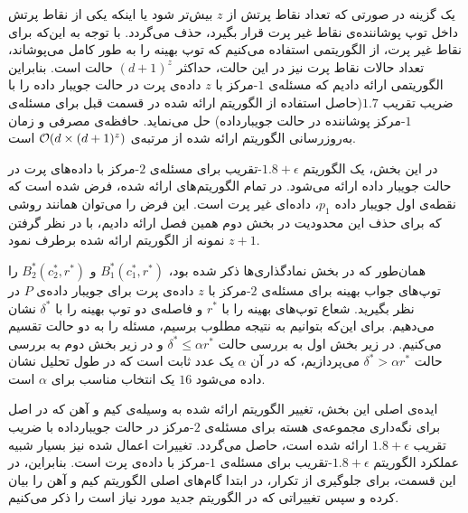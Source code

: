 یک گزینه در صورتی که تعداد نقاط‌ پرتش از $z$ بیش‌تر شود یا اینکه یکی از نقاط پرتش داخل توپ پوشاننده‌ی نقاط غیر پرت قرار بگیرد، حذف می‌گردد. با توجه به این‌که برای نقاط غیر پرت، از‌ الگوریتمی استفاده می‌کنیم که توپ بهینه را به طور کامل می‌پوشاند، تعداد حالات نقاط پرت نیز در این حالت، حداکثر $(d+1)^z$ حالت است. بنابراین الگوریتمی ارائه دادیم که مسئله‌ی $1$-مرکز با $z$ داده‌ی پرت در حالت جویبار داده را با ضریب تقریب $1.7$(حاصل استفاده از الگوریتم ارائه شده در قسمت قبل برای مسئله‌ی $1$-مرکز پوشاننده در حالت جویبارداده) حل می‌نماید. حافظه‌ی مصرفی و زمان به‌روزرسانی الگوریتم ارائه شده از مرتبه‌ی $\mathcal{O}(d \times (d+1)^z)$ است.


در این بخش، یک الگوریتم $1.8 + \epsilon$-تقریب برای مسئله‌ی $2$-مرکز با داده‌های پرت در حالت جویبار داده ارائه می‌شود.
در تمام الگوریتم‌های ارائه شده، فرض شده است که نقطه‌ی اول جویبار داده $p_1$، داده‌ای غیر پرت است.
این فرض را می‌توان همانند روشی که برای حذف این محدودیت در بخش دوم همین فصل ارائه دادیم، با در نظر گرفتن $z+1$ نمونه از الگوریتم ارائه شده برطرف نمود.

همان‌طور که در بخش نمادگذاری‌ها ذکر شده بود، $B_1^*(c_1^*, r^*)$ و $B_2^*(c_2^*, r^*)$ را توپ‌های جواب بهینه برای مسئله‌ی $2$-مرکز با $z$ داده‌ی پرت برای جویبار داده‌ی $P$ در نظر بگیرید.
شعاع توپ‌های بهینه را با $r^*$ و فاصله‌ی دو توپ بهینه را با $\delta^*$ نشان می‌دهیم.
برای این‌که بتوانیم به نتیجه مطلوب برسیم، مسئله را به دو حالت تقسیم می‌کنیم.
در زیر بخش اول به بررسی حالت $\delta^* \leq \alpha r^*$ و در زیر بخش دوم به بررسی حالت $\delta^* > \alpha r^*$ می‌پردازیم، که در آن $\alpha$ یک عدد ثابت است که در طول تحلیل نشان داده می‌شود $16$ یک انتخاب مناسب برای $\alpha$ است.



ایده‌ی اصلی این بخش، تغییر الگوریتم ارائه شده به وسیله‌ی کیم و آهن  که در اصل برای نگه‌داری مجموعه‌ی هسته برای مسئله‌ی $2$-مرکز در حالت جویبارداده با ضریب تقریب $1.8 + \epsilon$ ارائه شده است، حاصل می‌گردد. تغییرات اعمال شده نیز‌ بسیار شبیه عملکرد الگوریتم $1.8 + \epsilon$-تقریب برای مسئله‌ی $1$-مرکز با داده‌ی پرت است. بنابراین، در این قسمت، برای جلوگیری از تکرار، در ابتدا گام‌های اصلی الگوریتم کیم و آهن را بیان کرده و سپس تغییراتی که در الگوریتم جدید مورد نیاز است را ذکر می‌کنیم.

